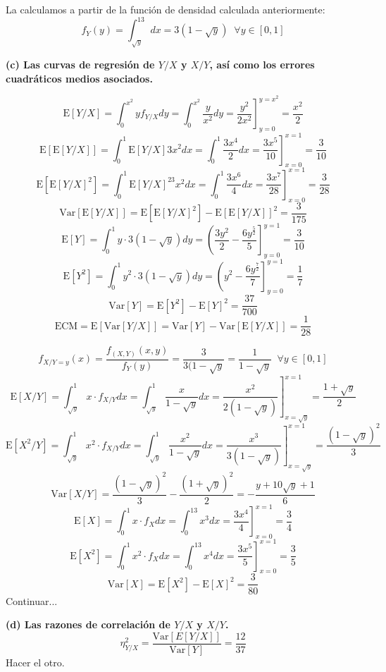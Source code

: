 \documentclass[11pt]{article}
\begin{document}
La calculamos a partir de la función de densidad calculada anteriormente:
$$f_Y(y)=\int_{\sqrt{y}}^13dx=3(1-\sqrt{y})\;\;\forall y \in [0,1]$$

\vspace{0.5cm}
\textbf{(c) Las curvas de regresión de $Y/X$ y $X/Y$, así como los errores cuadráticos medios asociados.}\\


$$\text{E}[Y/X]=\int_0^{x^2}yf_{Y/X}dy=\int_0^{x^2}\frac{y}{x^2}dy=\left.\frac{y^2}{2x^2}\right]_{y=0}^{y=x^2}=\frac{x^2}{2}$$
$$\text{E}[\text{E}[Y/X]]=\int_0^1\text{E}[Y/X]3x^2dx=\int_0^1\frac{3x^4}{2}dx=\left.\frac{3x^5}{10}\right]_{x=0}^{x=1}=\frac{3}{10}$$
$$\text{E}[\text{E}[Y/X]^2]=\int_0^1\text{E}[Y/X]^23x^2dx=\int_0^1\frac{3x^6}{4}dx=\left.\frac{3x^7}{28}\right]_{x=0}^{x=1}=\frac{3}{28}$$
$$\text{Var}[\text{E}[Y/X]]=\text{E}[\text{E}[Y/X]^2]-\text{E}[\text{E}[Y/X]]^2=\frac{3}{175}$$
$$\text{E}[Y]=\int_0^1y\cdot 3(1-\sqrt{y})dy=\left(\frac{3y^2}{2}-\frac{6y^{\frac{5}{2}}}{5}\right]_{y=0}^{y=1}=\frac{3}{10}$$
$$\text{E}[Y^2]=\int_0^1y^2\cdot 3(1-\sqrt{y})dy=\left(y^2-\frac{6y^{\frac{7}{2}}}{7}\right]_{y=0}^{y=1}=\frac{1}{7}$$
$$\text{Var}[Y]=\text{E}[Y^2]-\text{E}[Y]^2=\frac{37}{700}$$
$$\text{ECM}=\text{E}[\text{Var}[Y/X]]=\text{Var}[Y]-\text{Var}[\text{E}[Y/X]]=\frac{1}{28}$$


$$f_{X/Y=y}(x)=\frac{f_{(X,Y)}(x,y)}{f_Y(y)}=\frac{3}{3(1-\sqrt{y}}=\frac{1}{1-\sqrt{y}}\;\;\forall y \in [0,1]$$
$$\text{E}[X/Y]=\int_{\sqrt{y}}^1x\cdot f_{X/Y}dx=\int_{\sqrt{y}}^1\frac{x}{1-\sqrt y}dx=\left.\frac{x^2}{2(1-\sqrt y)}\right]_{x=\sqrt y}^{x=1}=\frac{1+\sqrt y}{2}$$
$$\text{E}[X^2/Y]=\int_{\sqrt y}^1 x^2\cdot f_{X/Y} dx=\int_{\sqrt y}^1 \frac{x^2}{1-\sqrt y}dx=\left.\frac{x^3}{3(1-\sqrt y)}\right]_{x=\sqrt y}^{x=1}=\frac{(1-\sqrt y)^2}{3}$$
$$\text{Var}[X/Y]=\frac{(1-\sqrt y)^2}{3}-\frac{(1+\sqrt y)^2}{2} = -\frac{y+10\sqrt y +1}{6}$$
$$\text{E}[X]=\int_0^1x\cdot f_X dx=\int_0^13x^3dx=\left.\frac{3x^4}{4}\right]_{x=0}^{x=1}=\frac{3}{4}$$
$$\text{E}[X^2]=\int_0^1x^2\cdot f_X dx=\int_0^13x^4dx=\left.\frac{3x^5}{5}\right]_{x=0}^{x=1}=\frac{3}{5}$$
$$\text{Var}[X]=\text{E}[X^2]-\text{E}[X]^2=\frac{3}{80}$$
Continuar...

\vspace{0.5cm}
\textbf{(d) Las razones de correlación de $Y/X$ y $X/Y$.}\\

$$\eta^2_{Y/X}=\frac{\text{Var}[E[Y/X]]}{\text{Var}[Y]}=\frac{12}{37}$$
Hacer el otro.
\end{document}
